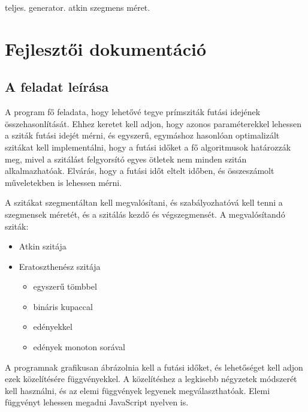 \documentclass[12pt]{report}
\begin{document}
{\color{red}teljes. generator. atkin szegmens méret.}

\chapter{Fejlesztői dokumentáció}

\section{A feladat leírása}

A program fő feladata, hogy lehetővé tegye prímsziták futási idejének összehasonlítását.
Ehhez keretet kell adjon, hogy azonos paraméterekkel lehessen a sziták futási idejét mérni,
és egyszerű, egymáshoz hasonlóan optimalizált szitákat kell implementálni,
hogy a futási időket a fő algoritmusok határozzák meg, mivel a szitálást felgyorsító
egyes ötletek nem minden szitán alkalmazhatóak.
Elvárás, hogy a futási időt eltelt időben, és összeszámolt műveletekben is lehessen mérni.

A szitákat szegmentáltan kell megvalósítani, és szabályozhatóvá kell tenni
a szegmensek méretét, és a szitálás kezdő és végszegmensét. A megvalósítandó sziták:
\begin{itemize}
\item Atkin szitája
\item Eratoszthenész szitája
\begin{itemize}
\item egyszerű tömbbel
\item bináris kupaccal
\item edényekkel
\item edények monoton sorával
\end{itemize}
\end{itemize}

A programnak grafikusan ábrázolnia kell a futási időket, és lehetőséget kell adjon
ezek közelítésére függvényekkel. A közelítéshez a legkisebb négyzetek módszerét
kell használni, és az elemi függvények legyenek megválaszthatóak.
Elemi függvényt lehessen megadni JavaScript nyelven is.
\end{document}
